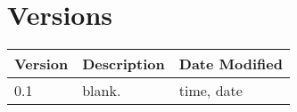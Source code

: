 \documentclass{article}
\begin{document}
    \section{Versions}


\begin{center}

\begin{tabular}{| l | p{8cm} | p{3cm}|}

\hline

\textbf{Version} & \textbf{Description} & \textbf{Date Modified} \\\hline

0.1 & blank. & time, date \\ \hline


\end{tabular}

\end{center}

 
\end{document}
